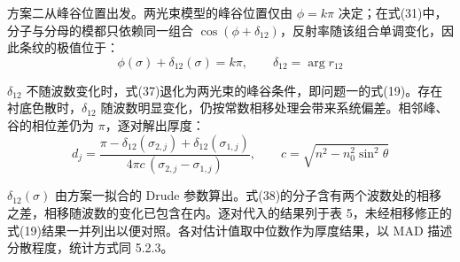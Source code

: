 方案二从峰谷位置出发。两光束模型的峰谷位置仅由 $\phi=k\pi$ 决定；在式(31)中，分子与分母的模都只依赖同一组合 $\cos(\phi+\delta_{12})$，反射率随该组合单调变化，因此条纹的极值位于：
\[
\phi(\sigma)+\delta_{12}(\sigma)=k\pi,
\qquad
\delta_{12}=\arg r_{12} \tag{37}
\]

$\delta_{12}$ 不随波数变化时，式(37)退化为两光束的峰谷条件，即问题一的式(19)。存在衬底色散时，$\delta_{12}$ 随波数明显变化，仍按常数相移处理会带来系统偏差。相邻峰、谷的相位差仍为 $\pi$，逐对解出厚度：
\[
d_j=\frac{\pi-\delta_{12}(\sigma_{2,j})+\delta_{12}(\sigma_{1,j})}
{4\pi c\,(\sigma_{2,j}-\sigma_{1,j})},
\qquad
c=\sqrt{n^2-n_0^2\sin^2\theta} \tag{38}
\]

$\delta_{12}(\sigma)$ 由方案一拟合的 Drude 参数算出。式(38)的分子含有两个波数处的相移之差，相移随波数的变化已包含在内。逐对代入的结果列于表 5，未经相移修正的式(19)结果一并列出以便对照。各对估计值取中位数作为厚度结果，以 MAD 描述分散程度，统计方式同 5.2.3。

